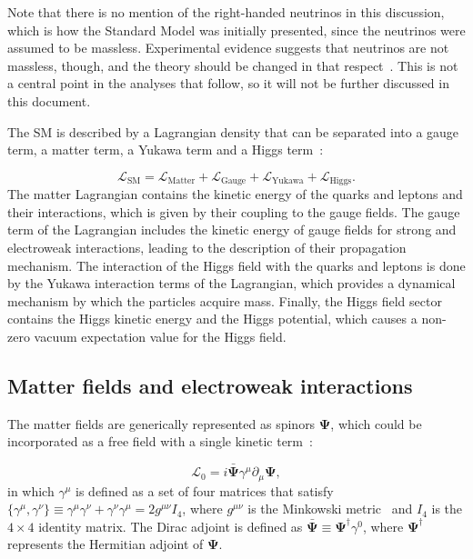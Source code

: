 Note that there is no mention of the right-handed neutrinos in this discussion, which is
how the Standard Model was initially presented, since the neutrinos were assumed to be massless. Experimental evidence suggests that neutrinos are not massless, though,
and the theory should be changed in that respect~\cite{neutrino1,neutrino2,neutrino3}. This is not a central point in the analyses that follow, so it will not be
further discussed in this document.

The SM is described by a Lagrangian density that can be separated into a gauge term, a matter term, a Yukawa term and a Higgs term~\cite{Incandela:2009pf}:

\begin{equation*}
\displaystyle
\mathcal{L}_{\textrm{SM}} = \mathcal{L}_{\textrm{Matter}} + \mathcal{L}_{\textrm{Gauge}} + \mathcal{L}_{\textrm{Yukawa}} + \mathcal{L}_{\textrm{Higgs}}.
\end{equation*}
The matter Lagrangian contains the kinetic energy of the quarks and leptons and their interactions, which is given by their coupling to the gauge fields.
The gauge term of the Lagrangian includes the kinetic energy of gauge fields for strong and electroweak
interactions, leading to the description of their propagation mechanism.
The interaction of the Higgs field with the quarks and leptons is done by the
Yukawa interaction terms of the Lagrangian, which provides a dynamical mechanism by which the
particles acquire mass.
Finally, the Higgs field sector contains the Higgs kinetic energy and the
Higgs potential, which causes a non-zero vacuum expectation value for the Higgs field.

\subsection{Matter fields and electroweak interactions}

The matter fields are generically represented as spinors $\mathbf{\Psi}$, which could be incorporated as a free field
with a single kinetic term~\cite{topreview_wagner,qft}:

\begin{equation}
\displaystyle
\mathcal{L}_0 = i \bar{\mathbf{\Psi}} \gamma^{\mu} \partial_\mu \mathbf{\Psi},
\label{eq:free_lagrangian}
\end{equation}
in which $\gamma^\mu$ is defined as a set of four matrices that satisfy $\{\gamma^\mu,\gamma^\nu\} \equiv \gamma^\mu \gamma^\nu + \gamma^\nu \gamma^\mu = 2 g^{\mu \nu} I_4$,
where $g^{\mu \nu}$ is the Minkowski metric~\cite{qft} and $I_4$ is the $4 \times 4$ identity matrix. The Dirac adjoint is defined as
$\bar{\mathbf{\Psi}} \equiv \mathbf{\Psi}^\dagger \gamma^0$, where $\mathbf{\Psi}^\dagger$ represents the Hermitian adjoint of $\mathbf{\Psi}$.


